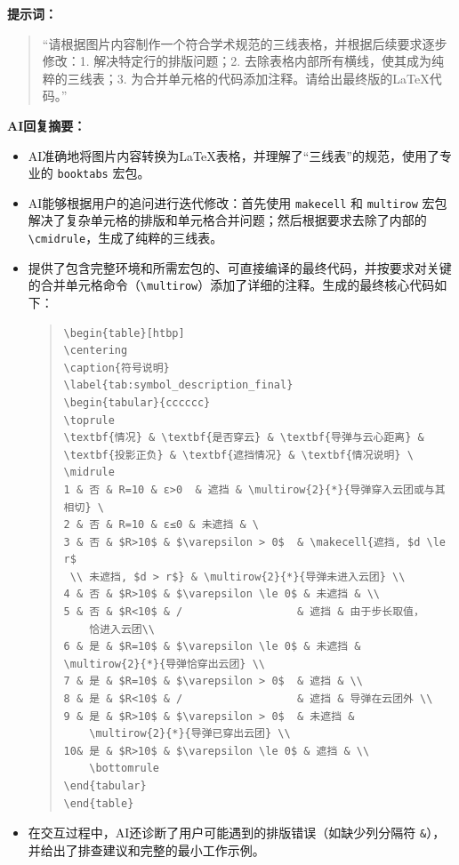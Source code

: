 \documentclass[12pt,a4paper]{article}
\begin{document}
\textbf{提示词：}
\begin{quote}
“请根据图片内容制作一个符合学术规范的三线表格，并根据后续要求逐步修改：1. 解决特定行的排版问题；2. 去除表格内部所有横线，使其成为纯粹的三线表；3. 为合并单元格的代码添加注释。请给出最终版的LaTeX代码。”
\end{quote}
\textbf{AI回复摘要：}
\begin{itemize}
\item AI准确地将图片内容转换为LaTeX表格，并理解了“三线表”的规范，使用了专业的 \texttt{booktabs} 宏包。
\item AI能够根据用户的追问进行迭代修改：首先使用 \texttt{makecell} 和 \texttt{multirow} 宏包解决了复杂单元格的排版和单元格合并问题；然后根据要求去除了内部的 \texttt{\textbackslash cmidrule}，生成了纯粹的三线表。
\item 提供了包含完整环境和所需宏包的、可直接编译的最终代码，并按要求对关键的合并单元格命令（\texttt{\textbackslash multirow}）添加了详细的注释。生成的最终核心代码如下：
\begin{quote}
\small
\begin{verbatim}
\begin{table}[htbp]
\centering
\caption{符号说明}
\label{tab:symbol_description_final}
\begin{tabular}{cccccc}
\toprule
\textbf{情况} & \textbf{是否穿云} & \textbf{导弹与云心距离} & 
\textbf{投影正负} & \textbf{遮挡情况} & \textbf{情况说明} \
\midrule
1 & 否 & R=10 & ε>0  & 遮挡 & \multirow{2}{*}{导弹穿入云团或与其相切} \
2 & 否 & R=10 & ε≤0 & 未遮挡 & \
3 & 否 & $R>10$ & $\varepsilon > 0$  & \makecell{遮挡, $d \le r$ 
 \\ 未遮挡, $d > r$} & \multirow{2}{*}{导弹未进入云团} \\
4 & 否 & $R>10$ & $\varepsilon \le 0$ & 未遮挡 & \\
5 & 否 & $R<10$ & /                  & 遮挡 & 由于步长取值，
    恰进入云团\\
6 & 是 & $R=10$ & $\varepsilon \le 0$ & 未遮挡 & 
\multirow{2}{*}{导弹恰穿出云团} \\
7 & 是 & $R=10$ & $\varepsilon > 0$  & 遮挡 & \\
8 & 是 & $R<10$ & /                  & 遮挡 & 导弹在云团外 \\
9 & 是 & $R>10$ & $\varepsilon > 0$  & 未遮挡 & 
    \multirow{2}{*}{导弹已穿出云团} \\
10& 是 & $R>10$ & $\varepsilon \le 0$ & 遮挡 & \\
    \bottomrule
\end{tabular}
\end{table}
\end{verbatim}
\end{quote}
\item 在交互过程中，AI还诊断了用户可能遇到的排版错误（如缺少列分隔符 \texttt{\&}），并给出了排查建议和完整的最小工作示例。
\end{itemize}
\end{document}
